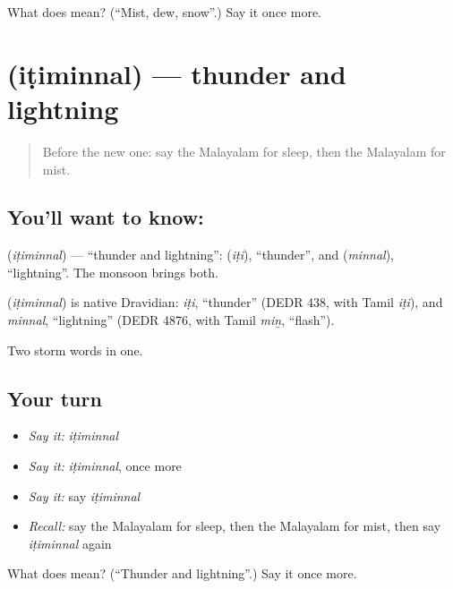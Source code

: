 \begin{tcolorbox}[breakable,colback=teal!4,colframe=teal!35!black,title={Before you move on}]
What does  mean? (\textquotedblleft{}Mist, dew, snow\textquotedblright{}.) Say it once more.
\end{tcolorbox}
\section[\texorpdfstring{\ml{ഇടിമിന്നൽ} (iṭiminnal)}{ഇടിമിന്നൽ (iṭiminnal)}]{ (iṭiminnal) — thunder and lightning}

\label{lesson:ML-C118-thunder}



\begin{quote}
Before the new one: say the Malayalam for sleep, then the Malayalam for mist.
\end{quote}

\subsection*{You'll want to know: }
\textbf{} (\emph{iṭiminnal}) — \textquotedblleft{}thunder and lightning\textquotedblright{}: \textbf{} (\emph{iṭi}), \textquotedblleft{}thunder\textquotedblright{}, and \textbf{} (\emph{minnal}), \textquotedblleft{}lightning\textquotedblright{}. The monsoon brings both.

\begin{cousinweb}
\textbf{} (\emph{iṭiminnal}) is native Dravidian: \emph{iṭi}, \textquotedblleft{}thunder\textquotedblright{} (DEDR 438, with Tamil \emph{iṭi}), and \emph{minnal}, \textquotedblleft{}lightning\textquotedblright{} (DEDR 4876, with Tamil \emph{miṉ}, \textquotedblleft{}flash\textquotedblright{}).
\end{cousinweb}

\begin{grammarlens}[title={What you've built}]
Two storm words in one.
\end{grammarlens}

\subsection*{Your turn}
\begin{itemize}
\raggedright
  \item \emph{Say it:} \emph{iṭiminnal}
  \item \emph{Say it:} \emph{iṭiminnal}, once more
  \item \emph{Say it:} say \emph{iṭiminnal}
  \item \emph{Recall:} say the Malayalam for sleep, then the Malayalam for mist, then say \emph{iṭiminnal} again
\end{itemize}

\begin{tcolorbox}[breakable,colback=teal!4,colframe=teal!35!black,title={Before you move on}]
What does  mean? (\textquotedblleft{}Thunder and lightning\textquotedblright{}.) Say it once more.
\end{tcolorbox}
